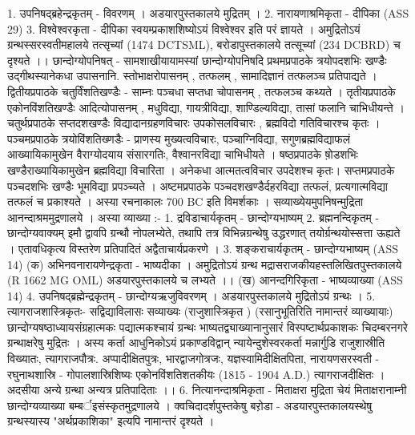 1. उपनिषद्ब्रहेन्द्रकृतम् - विवरणम् । अडयारपुस्तकालये मुद्रितम् । 
2. नारायणाश्रमिकृता - दीपिका (ASS 29) 
3. विश्वेश्वरकृता - दीपिका 
स्वयम्प्रकाशशिष्योऽयं विश्वेश्वर इति परं ज्ञायते । अमुद्रितोऽयं ग्रन्थस्सरस्वतीमहालये तत्सृच्यां (1474 DCTSML), बरोडापुस्तकालये तत्सूच्यां (234 DCBRD) च दृश्यते ।।
छान्दोग्योपनिषत् - 
सामशाखीयायामस्यां छान्दोग्योपनिषदि प्रथमप्रपाठके त्रयोपदशभिः खण्डैः उद्गीथस्यानेकधा उपासनानि. स्तोभाक्षरोपासनम् , तत्फलम् , सामादिज्ञानं तत्फलञ्च प्रतिपाद्यते । द्वितीयप्रपाठके चतुर्विंशतिखण्डैः - साम्नः पञ्चधा सप्तधा चोपासनम् , तत्फलञ्च कथ्यते । तृतीयप्रपाठके एकोनविंशतिखण्डैः आदित्योपासनम् , मधुविद्या, गायत्रीविद्या, शाण्डिल्यविद्या, तासां फलानि चाभिधीयन्ते । चतुर्थप्रपाठके सप्तदशखण्डैः विद्यादानग्रहणविचारः उपकोसलविचारः , ब्रह्मविदो गतिविचारश्च कृतः । पञ्चमप्रपाठके त्रयोविंशतिख्णडैः - प्राणस्य मुख्यत्वविचारः, पञ्चाग्निविद्या, सगुणब्रह्मविद्याफलं आख्यायिकामुखेन वैराग्योदयाय संसारगतिः, वैश्वानरविद्या चाभिधीयते । षष्ठप्रपाठके षो़डशभिः खण्डैराख्यायिकामुखेन ब्रह्मविद्या विचारिता । अनेकधा आत्मतत्वविचार उपदेशश्च कृतः। सप्तमप्रपाठके पञ्चदशभिः खण्डैः भूमविद्या प्रपञ्च्यते । अष्टमप्रपाठके पञ्चदशखण्डैर्दहरविद्या तत्फलं, प्रत्यगात्मविद्या तत्फलं च प्रकाश्यते । अस्या रचनाकालः 700 BC इति विमर्शकाः । सव्याख्येयमुपनिषन्मुद्रिता आनन्दाश्रममुद्रणालये । अस्या व्याख्या :- 
1. द्रविडाचार्यकृतम् - छान्दोग्यभाष्यम् 
2. ब्रह्मनन्दिकृतम् - छान्दोग्यवाक्यम् 
इमौ द्वावपि ग्रन्थौ नोपलभ्येते, तथापि तत्र विभिन्नग्रन्थेषु उद्धरणात् तयोर्ग्रन्थयोस्सत्ता ऊह्यते । एतावधिकृत्य विस्तरेण प्रतिपादितं अद्वैताचार्यप्रकरणे । 
3. शङ्कराचार्यकृतम् - छान्दोग्यभाष्यम् (ASS 14) 
(क) अभिनवनारायणेन्द्रकृता - भाष्यदीका । अमुद्रितोऽयं ग्रन्थ मद्रासराजकीयहस्तलिखितपुस्तकालये (R 1662 MG OML) अडयारपुस्तकालये च लभ्यते ।।
(ख) आनन्दगिरिकृता - भाष्यव्याख्या (ASS 14)
4. उपनिषद्ब्रह्मेन्द्रकृतम् - छान्दोग्यऋजुविवरणम् । अडयारपुस्तकालये मुद्रितोऽयं ग्रन्थः ।  
5.  त्यागराजशास्त्रिकृतः- सद्विद्याविलासः सव्याख्यः 
(राजुशास्त्रिकृत ) (रसानुभूतिरिति नामान्तरं व्याख्यायाः) 
छान्दोग्यषष्ठाध्यायसंग्रहात्मकः पद्यात्मकश्चायं ग्रन्थः भाष्यतद्व्याख्यानानुसारं विस्पष्टार्थप्रकाशकः चिदम्बरनगरे ग्रन्थाक्षरेषु मुद्रितः । 
अस्य कर्ता आधुनिकोऽयं प्रकाण्डविद्वान् न्यायेन्दुशेस्वरकर्ता मन्नार्गुडि राजुशास्रीति विख्यातः, त्यागराजपौत्रः. अप्पादीक्षितपुत्रः, भारद्वाजगोत्रजः, यज्ञस्वामिदीक्षितपिता, नारायणसरस्वती - रघुनाथशास्रि - गोपालशास्रिशिष्यः एकोनविंशतिशतकीयः (1815 - 1904 A.D.) त्यागराजदीक्षितः । अदसीया अन्ये ग्रन्था अन्यत्र प्रतिपादिताः ।। 
6. नित्यानन्दाश्रमिकृता -  मिताक्षरा 
मुद्रिता चेयं मिताक्षरानाम्नी छान्दोग्यव्याख्या बम्बर्इसंस्कृतमुद्रणालये । क्वचिदादर्शपुस्तकेषु बरो़डा - अडयारपुस्तकालयस्थेषु ग्रन्थस्यास्य "अर्थप्रकाशिका" इत्यपि नामान्तरं दृश्यते । 
